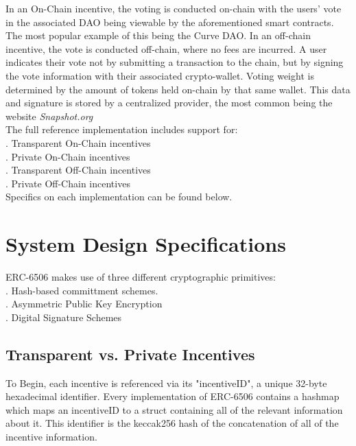 \documentclass{article}
\begin{document}
In an On-Chain incentive, the voting is conducted on-chain with the users' vote in the associated DAO being viewable by the aforementioned smart contracts. The most popular example of this being the Curve DAO. In an off-chain incentive, the vote is conducted off-chain, where no fees are incurred. A user indicates their vote not by submitting a transaction to the chain, but by signing the vote information with their associated crypto-wallet. Voting weight is determined by the amount of tokens held on-chain by that same wallet. This data and signature is stored by a centralized provider, the most common being the website \emph{Snapshot.org}\\

The full reference implementation includes support for:\\
. Transparent On-Chain incentives\\
. Private On-Chain incentives\\
. Transparent Off-Chain incentives\\
. Private Off-Chain incentives\\

Specifics on each implementation can be found below.

\section{System Design Specifications} 

ERC-6506 makes use of three different cryptographic primitives:\\

. Hash-based committment schemes.\\
. Asymmetric Public Key Encryption\\
. Digital Signature Schemes\\

\subsection{Transparent vs. Private Incentives}

To Begin, each incentive is referenced via its "incentiveID", a unique 32-byte hexadecimal identifier. Every implementation of ERC-6506 contains a hashmap which maps an incentiveID to a struct containing all of the relevant information about it. This identifier is the keccak256 hash of the concatenation of all of the incentive information. \\
\end{document}
